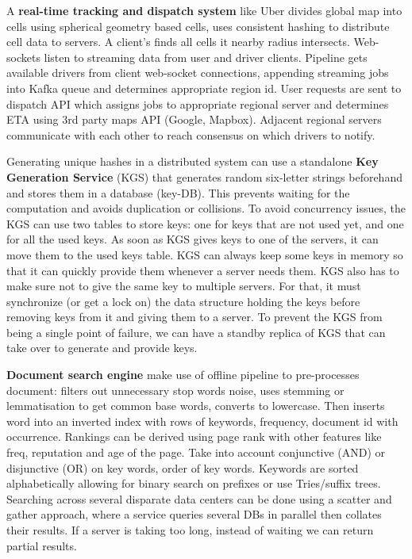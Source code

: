 \documentclass{article}
\begin{document}
    A \textbf{real-time tracking and dispatch system} like Uber divides global map into cells using spherical geometry based cells, uses consistent hashing to distribute cell data to servers. A client's finds all cells it nearby radius intersects. Web-sockets listen to streaming data from user and driver clients. Pipeline gets available drivers from client web-socket connections, appending streaming jobs into Kafka queue and determines appropriate region id. User requests are sent to dispatch API which assigns jobs to appropriate regional server and determines ETA using 3rd party maps API (Google, Mapbox). Adjacent regional servers communicate with each other to reach consensus on which drivers to notify.
    
    Generating unique hashes in a distributed system can use a standalone \textbf{Key Generation Service} (KGS) that generates random six-letter strings beforehand and stores them in a database (key-DB). This prevents waiting for the computation and avoids duplication or collisions. To avoid concurrency issues, the KGS can use two tables to store keys: one for keys that are not used yet, and one for all the used keys. As soon as KGS gives keys to one of the servers, it can move them to the used keys table. KGS can always keep some keys in memory so that it can quickly provide them whenever a server needs them. KGS also has to make sure not to give the same key to multiple servers. For that, it must synchronize (or get a lock on) the data structure holding the keys before removing keys from it and giving them to a server. To prevent the KGS from being a single point of failure, we can have a standby replica of KGS that can take over to generate and provide keys.
    
    \textbf{Document search engine} make use of offline pipeline to pre-processes document: filters out unnecessary stop words noise, uses stemming or lemmatisation to get common base words, converts to lowercase. Then inserts word into an inverted index with rows of keywords, frequency, document id with occurrence. Rankings can be derived using page rank with other features like freq, reputation and age of the page. Take into account conjunctive (AND) or disjunctive (OR) on key words, order of key words. Keywords are sorted alphabetically allowing for binary search on prefixes or use Tries/suffix trees. Searching across several disparate data centers can be done using a scatter and gather approach, where a service queries several DBs in parallel then collates their results. If a server is taking too long, instead of waiting we can return partial results.
    
\end{document}
